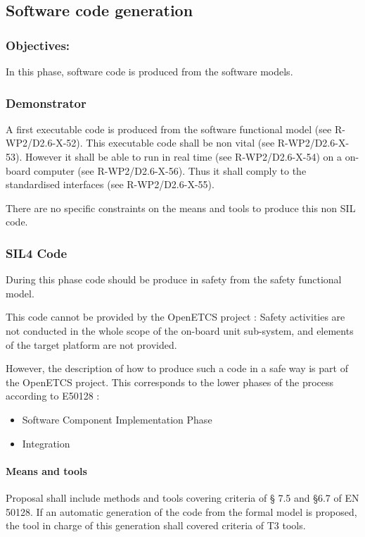 \subsection{Software code generation}
\label{sec:sw-code}



\subsubsection{Objectives:}
\label{sec:sw-req-objective}


In this phase, software code is produced from the software models.

\subsubsection{Demonstrator}
\label{sec:demo-phase}

A first executable code is produced from the software functional model (see R-WP2/D2.6-X-52). This executable code shall be non vital (see R-WP2/D2.6-X-53). However it shall be able to run in real time (see R-WP2/D2.6-X-54) on a on-board computer (see R-WP2/D2.6-X-56).
Thus it shall comply to the standardised interfaces (see R-WP2/D2.6-X-55). 

There are no specific constraints on the means and tools to  produce this non SIL code.


\subsubsection{SIL4 Code}
\label{sec:code-phase}

During this phase code should be produce in safety from the safety functional model.

This code cannot be provided by the OpenETCS project : Safety  activities are not conducted in the whole scope of the on-board unit sub-system, and elements of the target platform are not provided.

However, the description of how to  produce such a code in a safe way is part of the OpenETCS project. This corresponds to the lower phases of the process according to  E50128 :
\begin{itemize}
\item Software Component Implementation Phase
\item Integration
\end{itemize}


\paragraph{Means and tools}
\label{sec:code-means}

Proposal shall include methods and tools covering criteria of § 7.5 and §6.7 of EN 50128.
If an automatic generation of the code from the formal model is proposed, the tool in charge of this generation shall covered criteria of T3 tools.





